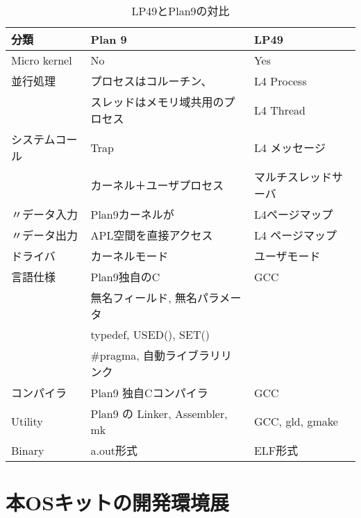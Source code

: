 \documentclass{jarticle}
\begin{document}
\begin{table}[htb]
\caption[Plan9vsLP40]{LP49とPlan9の対比 }
\label{table:LP49-Plan9}
\begin{center}
{\footnotesize 
\begin{tabular}{|l|l|l|}
\hline
 分類  & Plan 9 & LP49 \\
\hline

Micro kernel  &     No        &   Yes   \\
\hline

並行処理  &  プロセスはコルーチン、 &   L4 Process  \\
          &  スレッドはメモリ域共用のプロセス &  L4 Thread \\
\hline

システムコール    & Trap       &     L4 メッセージ \\
                  & カーネル＋ユーザプロセス    & マルチスレッドサーバ \\
\hline

〃データ入力      & Plan9カーネルが   & L4ページマップ \\
〃データ出力      & APL空間を直接アクセス          & L4 ページマップ \\
\hline

ドライバ     & カーネルモード    & ユーザモード  \\
\hline

言語仕様 &  Plan9独自のC                     &   GCC  　\\
         &  無名フィールド, 無名パラメータ   & \\
         &  typedef, USED(), SET()           &    \\
         &   \#pragma, 自動ライブラリリンク  & \\
\hline

コンパイラ  &   Plan9 独自Cコンパイラ   &   GCC \\
\hline

 Utility  &  Plan9 の Linker, Assembler, mk    & GCC, gld, gmake \\
\hline

Binary    &  a.out形式         &    ELF形式 \\
\hline

\end{tabular}
}
\end{center}
\end{table}


\section{本OSキットの開発環境展}
\end{document}
